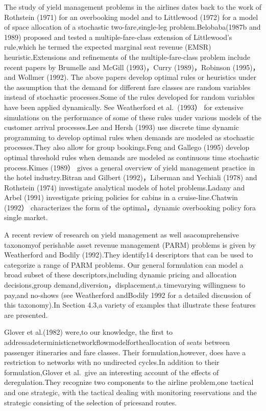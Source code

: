 The study of yield management problems in the airlines dates back to the work of Rothstein (1971) for an overbooking model and to Littlewood (1972) for a model of space allocation of a stochastic two-fare,single-leg problem.Belobaba(1987b and 1989) proposed and tested a multiple-fare-class extension of Littlewood's rule,which he termed the expected marginal seat revenue (EMSR) heuristic.Extensions and refinements of the multiple-fare-class problem include recent papers by Brumelle and McGill (1993)，Curry (1989)，Robinson (1995)，and Wollmer (1992). The above papers develop optimal rules or heuristics under the assumption that the demand for different fare classes are random variables instead of stochastic processes.Some of the rules developed for random variables have been applied dynamically. See Weatherford et al.~(1993） for extensive simulations on the performance of some of these rules under various models of the customer arrival processes.Lee and Hersh (1993) use discrete time dynamic programming to develop optimal rules when demands are modeled as stochastic processes.They also allow for group bookings.Feng and Gallego (1995) develop optimal threshold rules when demands are modeled as continuous time stochastic process.Kimes (1989） gives a general overview of yield management practice in the hotel industry.Bitran and Gilbert (1992)，Liberman and Yechiali (1978) and Rothstein (1974) investigate analytical models of hotel problems.Ladany and Arbel (1991) investigate pricing policies for cabins in a cruise-line.Chatwin (1992） characterizes the form of the optimal，dynamic overbooking policy fora single market.

A recent review of research on yield management as well asacomprehensive taxonomyof perishable asset revenue management (PARM) problems is given by Weatherford and Bodily (1992).They identify14 descriptors that can be used to categorize a range of PARM problems. Our general formulation can model a broad subset of these descriptors,including dynamic pricing and allocation decisions,group demand,diversion，displacement,a timevarying willingness to pay,and no-shows (see Weatherford andBodily 1992 for a detailed discussion of this taxonomy).In Section 4.3,a variety of examples that illustrate these features are presented.

Glover et al.(1982) were,to our knowledge, the first to addressadeterministicnetworkflowmodelfortheallocation of seats between passenger itineraries and fare classes. Their formulation,however, does have a restriction to networks with no undirected cycles.In addition to their formulation,Glover et al.~give an interesting account of the effects of deregulation.They recognize two components to the airline problem,one tactical and one strategic, with the tactical dealing with monitoring reservations and the strategic consisting of the selection of pricesand routes.

